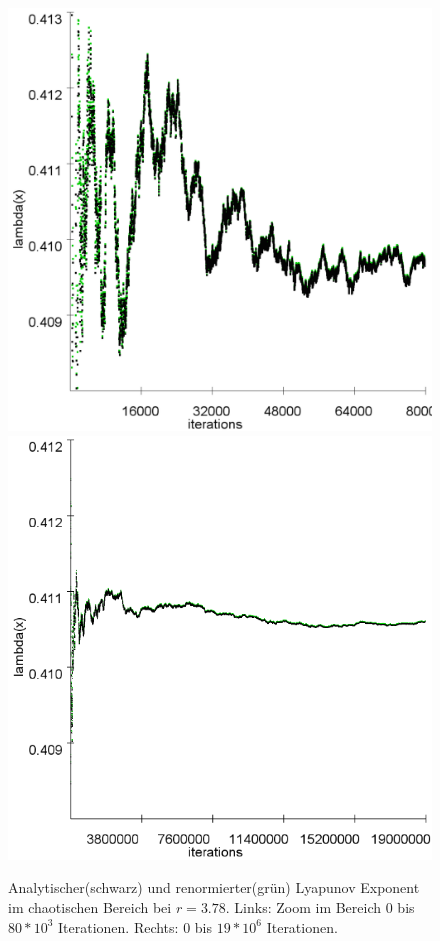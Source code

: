 \documentclass{scrartcl}
\begin{document}
\begin{figure}
\centering
\includegraphics[scale=0.18]{lya378-zoom}
\includegraphics[scale=0.36]{lya378}
\caption{Analytischer(schwarz) und renormierter(grün) Lyapunov Exponent im chaotischen Bereich bei $r=3.78$. Links: Zoom im Bereich 0 bis $80*10^3$ Iterationen. Rechts:  0 bis $19*10^6$ Iterationen.}
\label{fig:lyapunov-chaos}
\end{figure}
\end{document}
